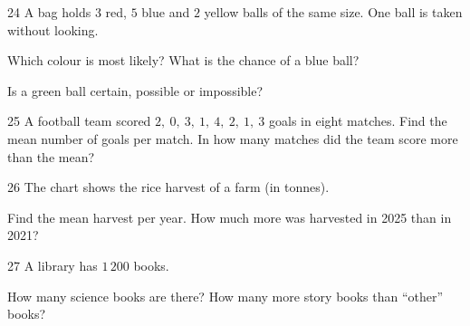 \gap
\begin{probbox}{24}{\relax}
A bag holds $3$ red, $5$ blue and $2$ yellow balls of the same size. One ball is taken without looking.\par
{} Which colour is most likely? \quad {} What is the chance of a blue ball?\par
{} Is a green ball certain, possible or impossible?
\end{probbox}
\gap
\begin{probbox}{25}{\relax}
A football team scored $2,\ 0,\ 3,\ 1,\ 4,\ 2,\ 1,\ 3$ goals in eight matches. Find the mean number of goals per match. In how many matches did the team score more than the mean?
\end{probbox}
\gap
\needspace{8.5cm}
\begin{probbox}{26}{\relax}
The chart shows the rice harvest of a farm (in tonnes).
\begin{center}
\end{center}
 Find the mean harvest per year. \quad {} How much more was harvested in 2025 than in 2021?
\end{probbox}
\gap
\needspace{7.5cm}
\begin{probbox}{27}{\relax}
A library has $1\,200$ books.
\begin{center}
\end{center}
 How many science books are there? \quad {} How many more story books than ``other'' books?
\end{probbox}
